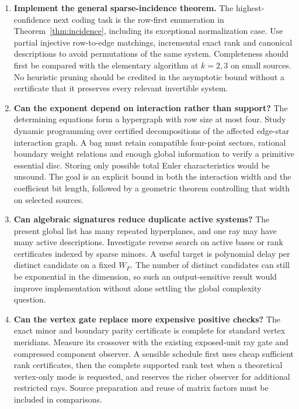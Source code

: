 \begin{enumerate}[label=A\arabic*.]
\item \textbf{Implement the general sparse-incidence theorem.}
The highest-confidence next coding task is the row-first enumeration in
Theorem~\ref{thm:incidence}, including its exceptional normalization case.
Use partial injective row-to-edge matchings, incremental exact rank and
canonical descriptions to avoid permutations of the same system.
Completeness should first be compared with the elementary algorithm at
$k=2,3$ on small sources. No heuristic pruning should be credited in the
asymptotic bound without a certificate that it preserves every relevant
invertible system.

\item \textbf{Can the exponent depend on interaction rather than support?}
The determining equations form a hypergraph with row size at most four.
Study dynamic programming over certified decompositions of the affected
edge-star interaction graph. A bag must retain compatible four-point
sectors, rational boundary weight relations and enough global information
to verify a primitive essential disc. Storing only possible total Euler
characteristics would be unsound. The goal is an explicit bound in both
the interaction width and the coefficient bit length, followed by a
geometric theorem controlling that width on selected sources.

\item \textbf{Can algebraic signatures reduce duplicate active systems?}
The present global list has many repeated hyperplanes, and one ray may
have many active descriptions. Investigate reverse search on active
bases or rank certificates indexed by sparse minors. A useful target is
polynomial delay per distinct candidate on a fixed $W_F$. The number of
distinct candidates can still be exponential in the dimension, so such
an output-sensitive result would improve implementation without alone
settling the global complexity question.

\item \textbf{Can the vertex gate replace more expensive positive checks?}
The exact minor and boundary parity certificate is complete for standard
vertex meridians. Measure its crossover with the existing exposed-unit
ray gate and compressed component observer. A sensible schedule first
uses cheap sufficient rank certificates, then the complete supported
rank test when a theoretical vertex-only mode is requested, and reserves
the richer observer for additional restricted rays. Source preparation
and reuse of matrix factors must be included in comparisons.


\end{enumerate}
